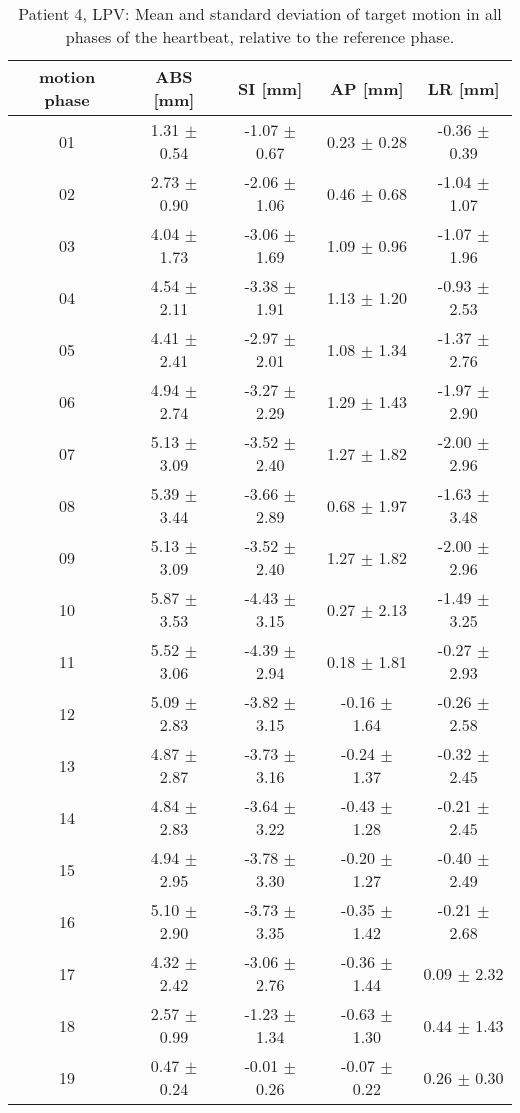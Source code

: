 \begin{table}[htbp]
  \centering
    \tiny
  \caption{Patient 4, LPV: Mean and standard deviation of target motion in all phases of the heartbeat, relative to the reference phase.}
  \begin{tabular}{|c|c|c|c|c|}
    \hline\hline
    motion phase\rule{0pt}{2.6ex}\rule[-1.2ex]{0pt}{0pt} & ABS [mm] & SI [mm] & AP [mm] & LR [mm]\\
    \hline
01& 1.31 $\pm$ 0.54& -1.07 $\pm$ 0.67& 0.23 $\pm$ 0.28& -0.36 $\pm$ 0.39 \\
02& 2.73 $\pm$ 0.90& -2.06 $\pm$ 1.06& 0.46 $\pm$ 0.68& -1.04 $\pm$ 1.07 \\
03& 4.04 $\pm$ 1.73& -3.06 $\pm$ 1.69& 1.09 $\pm$ 0.96& -1.07 $\pm$ 1.96 \\
04& 4.54 $\pm$ 2.11& -3.38 $\pm$ 1.91& 1.13 $\pm$ 1.20& -0.93 $\pm$ 2.53 \\
05& 4.41 $\pm$ 2.41& -2.97 $\pm$ 2.01& 1.08 $\pm$ 1.34& -1.37 $\pm$ 2.76 \\
06& 4.94 $\pm$ 2.74& -3.27 $\pm$ 2.29& 1.29 $\pm$ 1.43& -1.97 $\pm$ 2.90 \\
07& 5.13 $\pm$ 3.09& -3.52 $\pm$ 2.40& 1.27 $\pm$ 1.82& -2.00 $\pm$ 2.96 \\
08& 5.39 $\pm$ 3.44& -3.66 $\pm$ 2.89& 0.68 $\pm$ 1.97& -1.63 $\pm$ 3.48 \\
09& 5.13 $\pm$ 3.09& -3.52 $\pm$ 2.40& 1.27 $\pm$ 1.82& -2.00 $\pm$ 2.96 \\
10& 5.87 $\pm$ 3.53& -4.43 $\pm$ 3.15& 0.27 $\pm$ 2.13& -1.49 $\pm$ 3.25 \\
11& 5.52 $\pm$ 3.06& -4.39 $\pm$ 2.94& 0.18 $\pm$ 1.81& -0.27 $\pm$ 2.93 \\
12& 5.09 $\pm$ 2.83& -3.82 $\pm$ 3.15& -0.16 $\pm$ 1.64& -0.26 $\pm$ 2.58 \\
13& 4.87 $\pm$ 2.87& -3.73 $\pm$ 3.16& -0.24 $\pm$ 1.37& -0.32 $\pm$ 2.45 \\
14& 4.84 $\pm$ 2.83& -3.64 $\pm$ 3.22& -0.43 $\pm$ 1.28& -0.21 $\pm$ 2.45 \\
15& 4.94 $\pm$ 2.95& -3.78 $\pm$ 3.30& -0.20 $\pm$ 1.27& -0.40 $\pm$ 2.49 \\
16& 5.10 $\pm$ 2.90& -3.73 $\pm$ 3.35& -0.35 $\pm$ 1.42& -0.21 $\pm$ 2.68 \\
17& 4.32 $\pm$ 2.42& -3.06 $\pm$ 2.76& -0.36 $\pm$ 1.44& 0.09 $\pm$ 2.32 \\
18& 2.57 $\pm$ 0.99& -1.23 $\pm$ 1.34& -0.63 $\pm$ 1.30& 0.44 $\pm$ 1.43 \\
19& 0.47 $\pm$ 0.24& -0.01 $\pm$ 0.26& -0.07 $\pm$ 0.22& 0.26 $\pm$ 0.30 \\
    \hline\hline
  \end{tabular}
\end{table}

